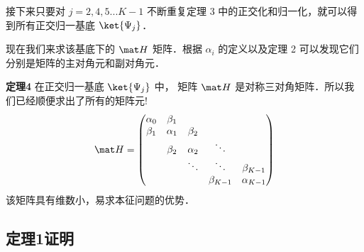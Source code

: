 接下来只要对 $j = 2,4,5...K - 1$ 不断重复定理 3 中的正交化和归一化，就可以得到所有正交归一基底 $\ket{\Psi _j} $．

现在我们来求该基底下的 $\mat H$ 矩阵．根据 $\alpha_i$ 的定义以及定理 2 可以发现它们分别是矩阵的主对角元和副对角元．

{\noindent \textbf{定理4}}
在正交归一基底 $\ket{\Psi _j}$ 中， 矩阵 $\mat H$ 是对称三对角矩阵．所以我们已经顺便求出了所有的矩阵元!
\begin{equation}
\mat H =
\begin{pmatrix}
\alpha _0 & \beta _1 &&& \\ 
\beta _1 & \alpha _1 & \beta _2 && \\ 
 & \beta _2 & \alpha _2 & \ddots&  \\ 
& & \ddots& \ddots & {\beta _{K - 1}} \\
&&&\beta_{K - 1} &{\alpha _{K - 1}}
\end{pmatrix}\end{equation}
该矩阵具有维数小，易求本征问题的优势．


\subsection{定理1证明}


